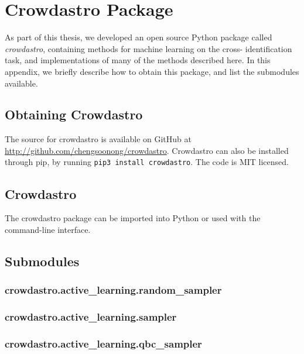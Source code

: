 
\appendix
\chapter{Crowdastro Package}
\label{cha:crowdastro}

As part of this thesis, we developed an open source Python package called
\emph{crowdastro}, containing methods for machine learning on the cross-%
identification task, and implementations of many of the methods described here.
In this appendix, we briefly describe how to obtain this package, and list the
submodules available.

\section{Obtaining Crowdastro}

    The source for crowdastro is available on GitHub at
    \url{http://github.com/chengsoonong/crowdastro}. Crowdastro can also be
    installed through pip, by running \texttt{pip3 install crowdastro}. The code
    is MIT licensed.

\section{Crowdastro}

    The crowdastro package can be imported into Python or used with the
    command-line interface.


\section{Submodules}
    \label{sec:crowdastro-submodules}

    \subsection{crowdastro.active\_learning.random\_sampler}
        \label{sec:crowdastro-random-sampler}
    \subsection{crowdastro.active\_learning.sampler}
        \label{sec:crowdastro-sampler}
    \subsection{crowdastro.active\_learning.qbc\_sampler}
        \label{sec:crowdastro-qbc-sampler}
